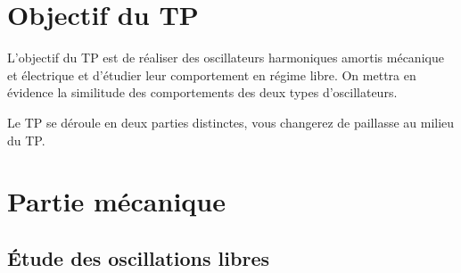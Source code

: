 \documentclass{tp}
\begin{document}
\section{Objectif du TP}
L'objectif du TP est de réaliser des oscillateurs harmoniques amortis mécanique et électrique et d'étudier leur comportement en régime libre. On mettra en évidence la similitude des comportements des deux types d'oscillateurs.

Le TP se déroule en deux parties distinctes, vous changerez de paillasse au milieu du TP.

\section{Partie mécanique}%
\label{sec:partie_mecanique}

\subsection{Étude des oscillations libres}%
\label{sub:etude_des_oscillations_libres}
\end{document}
